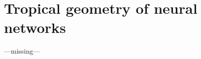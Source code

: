 \documentclass{article}
\theoremstyle{definition}
\begin{document}
\newpage

\section{Tropical geometry of neural networks}
\label{sec:tropical_geometry_of_neural_networks}

---missing---

\newpage

%
%
%
%
%
%
%
%
%
%
%


%

%
%



\end{document}
